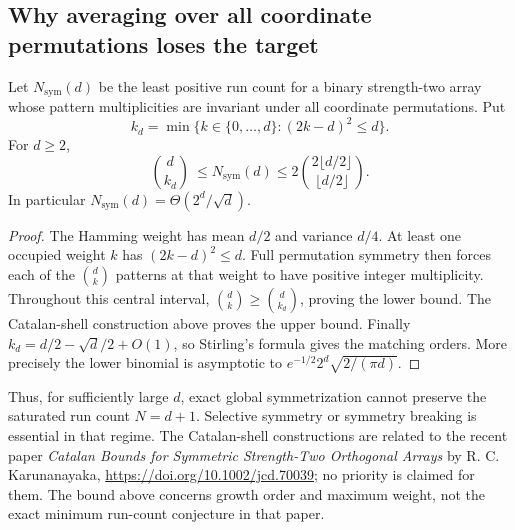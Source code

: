 \subsection{Why averaging over all coordinate permutations loses the target}
\begin{proposition}
Let $N_{\mathrm{sym}}(d)$ be the least positive run count for a binary
strength-two array whose pattern multiplicities are invariant under all
coordinate permutations. Put
\[
 k_d=\min\{k\in\{0,\ldots,d\}:(2k-d)^2\le d\}.
\]
For $d\ge2$,
\[
 \binom d{k_d}\ \le N_{\mathrm{sym}}(d)
 \le 2\binom{2\lfloor d/2\rfloor}{\lfloor d/2\rfloor}.
\]
In particular $N_{\mathrm{sym}}(d)=\Theta(2^d/\sqrt d)$.
\end{proposition}
\begin{proof}
The Hamming weight has mean $d/2$ and variance $d/4$. At least one
occupied weight $k$ has $(2k-d)^2\le d$. Full permutation symmetry
then forces each of the $\binom dk$ patterns at that weight to have
positive integer multiplicity. Throughout this central interval,
$\binom dk\ge\binom d{k_d}$, proving the lower bound. The Catalan-shell
construction above proves the upper bound. Finally
$k_d=d/2-\sqrt d/2+O(1)$, so Stirling's formula gives the matching
orders. More precisely the lower binomial is asymptotic to
$e^{-1/2}2^d\sqrt{2/(\pi d)}$.
\end{proof}
Thus, for sufficiently large $d$, exact global symmetrization cannot
preserve the saturated run count $N=d+1$. Selective symmetry or symmetry
breaking is essential in that regime. The
Catalan-shell constructions are related to the recent paper
\emph{Catalan Bounds for Symmetric Strength-Two Orthogonal Arrays}
by R. C. Karunanayaka,
\url{https://doi.org/10.1002/jcd.70039}; no priority is claimed for them.
The bound above concerns growth order and maximum weight, not the exact
minimum run-count conjecture in that paper.

